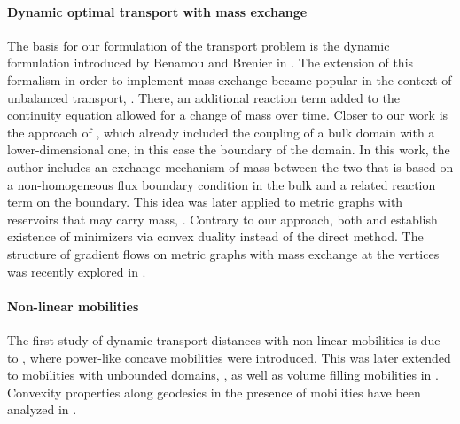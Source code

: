 \documentclass{article}
\begin{document}
\paragraph*{Dynamic optimal transport with mass exchange}
The basis for our formulation of the transport problem is the dynamic formulation introduced by Benamou and Brenier in \cite{benamou2000computational}. The extension of this formalism in order to implement mass exchange became popular in the context of unbalanced transport, \cite{chizat2018unbalanced, liero2018optimal, kondratyev2016new}. There, an additional reaction term added to the continuity equation allowed for a change of mass over time. Closer to our work is the approach of \cite{monsaingeon2021new}, which already included the coupling of a bulk domain with a lower-dimensional one, in this case the boundary of the domain. In this work, the author includes an exchange mechanism of mass between the two that is based on a non-homogeneous flux boundary condition in the bulk and a related reaction term on the boundary. This idea was later applied to metric graphs with reservoirs that may carry mass, \cite{BurgerHumpertPietschmann2023, Fazeny2024}. Contrary to our approach, both \cite{monsaingeon2021new} and \cite{BurgerHumpertPietschmann2023} establish existence of minimizers via convex duality instead of the direct method. The structure of gradient flows on metric graphs with mass exchange at the vertices was recently explored in \cite{Heinze2024}.

\paragraph*{Non-linear mobilities}
The first study of dynamic transport distances with non-linear mobilities is due to \cite{Dolbeault_2008}, where power-like concave mobilities were introduced. This was later extended to mobilities with unbounded domains, \cite{Carrillo2010}, as well as volume filling mobilities in \cite{Lisini2010}. Convexity properties along geodesics in the presence of mobilities have been analyzed in \cite{Carrillo2010}.
\end{document}
